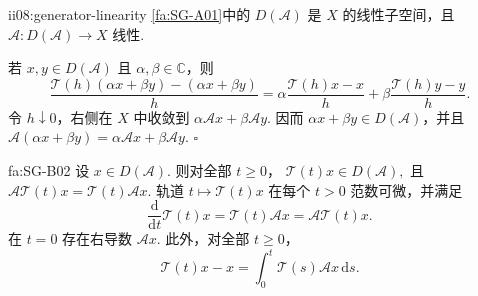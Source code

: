 \begin{FAProposition}[B][生成元的线性]{ii08:generator-linearity}
\autoref{fa:SG-A01}中的 \(\displaystyle D(\mathcal A)\) 是 \(\displaystyle X\) 的线性子空间，且 \(\displaystyle\mathcal A:D(\mathcal A)\to X\) 线性.
\end{FAProposition}

\begin{FAProof}
若 \(\displaystyle x,y\in D(\mathcal A)\) 且 \(\displaystyle\alpha,\beta\in\mathbb C\)，则
\[
\frac{\mathcal T(h)(\alpha x+\beta y)-(\alpha x+\beta y)}{h}
=
\alpha\frac{\mathcal T(h)x-x}{h}
+
\beta\frac{\mathcal T(h)y-y}{h}.
\]
令 \(\displaystyle h\downarrow0\)，右侧在 \(\displaystyle X\) 中收敛到 \(\displaystyle\alpha\mathcal Ax+\beta\mathcal Ay\). 因而 \(\displaystyle\alpha x+\beta y\in D(\mathcal A)\)，并且 \(\displaystyle\mathcal A(\alpha x+\beta y)=\alpha\mathcal Ax+\beta\mathcal Ay\).
\hfill\(\square\)
\end{FAProof}

\begin{FATheorem}[B][生成元域不变与轨道微分]{fa:SG-B02}
设 \(\displaystyle x\in D(\mathcal A)\). 则对全部 \(\displaystyle t\geqslant0\)，
\(\displaystyle \mathcal T(t)x\in D(\mathcal A),\)
且
\(\displaystyle \mathcal A\mathcal T(t)x = \mathcal T(t)\mathcal Ax.\)
轨道 \(\displaystyle t\mapsto\mathcal T(t)x\) 在每个 \(\displaystyle t>0\) 范数可微，并满足
\[
\frac{\mathrm{d}}{\mathrm{d}t}\mathcal T(t)x
=
\mathcal T(t)\mathcal Ax
=
\mathcal A\mathcal T(t)x.
\]
在 \(\displaystyle t=0\) 存在右导数 \(\displaystyle\mathcal Ax\). 此外，对全部 \(\displaystyle t\geqslant0\)，
\[
\mathcal T(t)x-x
=
\int_0^t\mathcal T(s)\mathcal Ax\,\mathrm{d}s.
\]
\end{FATheorem}

